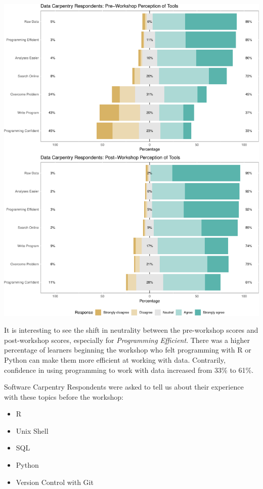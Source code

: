 \documentclass[]{article}
\makeatletter
\def\maxwidth{\ifdim\Gin@nat@width>\linewidth\linewidth\else\Gin@nat@width\fi}
\providecommand{\tightlist}{%
  \setlength{\itemsep}{0pt}\setlength{\parskip}{0pt}}
\makeatother
\begin{document}
\includegraphics[width=\maxwidth]{../figures/dc-tools-perception-1}

It is interesting to see the shift in neutrality between the
pre-workshop scores and post-workshop scores, especially for
\emph{Programming Efficient}. There was a higher percentage of learners
beginning the workshop who felt programming with R or Python can make
them more efficient at working with data. Contrarily, confidence in
using programming to work with data increased from 33\% to 61\%.

Software Carpentry Respondents were asked to tell us about their
experience with these topics before the workshop:

\begin{itemize}
\tightlist
\item
  R
\item
  Unix Shell
\item
  SQL
\item
  Python
\item
  Version Control with Git
\end{itemize}
\end{document}
